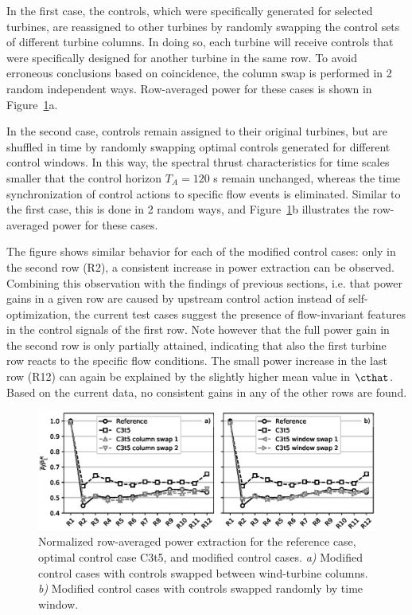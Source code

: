 	In the first case, the controls, which were specifically generated for selected turbines, are reassigned to other turbines by randomly swapping the control sets of different turbine columns. In doing so, each turbine will receive controls that were specifically designed for another turbine in the same row. To avoid erroneous conclusions based on coincidence, the column swap is performed in 2 random independent ways. Row-averaged power for these cases is shown in Figure~\ref{fig:scrambled}a. 
	
	In the second case, controls remain assigned to their original turbines, but are shuffled in time by randomly swapping optimal controls generated for different control windows. In this way, the spectral thrust characteristics for time scales smaller that the control horizon $T_A = 120$ s remain unchanged, whereas the time synchronization of control actions to specific flow events is eliminated. Similar to the first case, this is done in 2 random ways, and Figure~\ref{fig:scrambled}b illustrates the row-averaged power for these cases.

	The figure shows similar behavior for each of the modified control cases: only in the second row (R2), a consistent increase in power extraction can be observed. Combining this observation with the findings of previous sections, i.e. that power gains in a given row are caused by upstream control action instead of self-optimization, the current test cases suggest the presence of flow-invariant	features in the control signals of the first row. Note however that the full power gain in the second row is only partially attained, indicating that also the first turbine row reacts to the specific flow conditions. The small power increase in the last row (R12) can again be explained by the slightly higher mean value in $\cthat$. Based on the current data, no consistent gains in any of the other rows are found. 

	\begin{figure}
		\includegraphics[width=\textwidth]{chapters/analysis_induction_control/scrambled.eps}
		\caption[Normalized row-averaged power extraction for the reference case, optimal control case C3t5, and modified control cases.]{Normalized row-averaged power extraction for the reference case, optimal control case C3t5, and modified control cases. \emph{a)} Modified control cases with controls swapped between wind-turbine columns. \emph{b)} Modified control cases with controls swapped randomly by time window. \label{fig:scrambled}}
	\end{figure}

